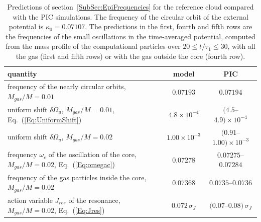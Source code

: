 \begin{table}[htp]
\begin{center}
\begin{tabular}{l|c|c}
\hline\hline
quantity & model & PIC \\
\hline
frequency of the nearly circular orbits, $M_{gas}/M = 0.01$ & $0.07193$ & $0.07194$ \\
uniform shift $\delta\Omega_u$, $M_{gas}/M = 0.01$, Eq.~(\ref{Eq:UniformShift}) & $4.8\times 10^{-4}$ & $(4.5$--$4.9)\times 10^{-4}$ \\
uniform shift $\delta\Omega_u$, $M_{gas}/M = 0.02$ & $1.00\times 10^{-3}$ & $(0.91$--$1.00)\times 10^{-3}$ \\
frequency $\omega_c$ of the oscillation of the core, $M_{gas}/M = 0.02$, Eq.~(\ref{Eq:omegac}) & $0.07278$ & $0.07275$--$0.07284$ \\
frequency of the gas particles inside the core, $M_{gas}/M = 0.02$ & $0.07368$ & $0.0735$--$0.0736$ \\
action variable $J_{res}$ of the resonance, $M_{gas}/M = 0.02$, Eq.~(\ref{Eq:Jres}) & $0.072\,\sigma_J$ & $(0.07$--$0.08)\,\sigma_J$ \\
\hline\hline
\end{tabular}
\end{center}
\caption{Predictions of section~\ref{SubSec:EpiFrequencies} for the reference cloud compared with the PIC simulations. The frequency of the circular orbit of the external potential is $\kappa_0 = 0.07107$. The predictions in the first, fourth and fifth rows are the frequencies of the small oscillations in the time-averaged potential, computed from the mass profile of the computational particles over $20\leq t/\tau_1\leq 30$, with all the gas (first and fifth rows) or with the gas outside the core (fourth row).}
\label{Tab:ModelFrequencies}
\end{table}

